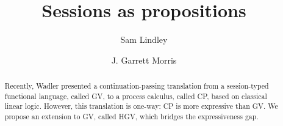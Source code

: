 \documentclass{easychair}
\newcommand{\hgv}{HGV\xspace}
\newcommand{\hgvpi}{HGV$\pi$\xspace}
\begin{document}
\title{Sessions as propositions}



%
\author{
  Sam Lindley
  \and
  J. Garrett Morris
}





\clearpage

\maketitle


\begin{abstract}
Recently, Wadler presented a continuation-passing translation from a session-typed functional
language, called GV, to a process calculus, called CP, based on classical linear logic. However,
this translation is one-way: CP is more expressive than GV. We propose an extension to GV, called
\hgv, which bridges the expressiveness gap.
\end{abstract}
\end{document}
